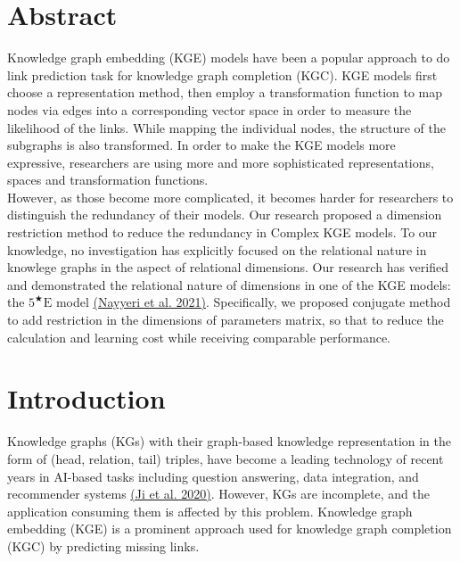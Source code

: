 \documentclass[9pt]{ctexart}
\theoremstyle{definition}
\begin{document}

\section{Abstract}
Knowledge graph embedding (KGE) models have been a popular approach to do link prediction task for knowledge graph completion (KGC).
KGE models first choose a representation method, then employ a transformation function to map nodes via edges into a corresponding vector space in order to measure the likelihood of the links.
While mapping the individual nodes, the structure of the subgraphs is also transformed.
In order to make the KGE models more expressive, researchers are using more and more sophisticated representations, spaces and transformation functions.\\
However, as those become more complicated, it becomes harder for researchers to distinguish the redundancy of their models.
Our research proposed a dimension restriction method to reduce the redundancy in Complex KGE models.
To our knowledge, no investigation has explicitly focused on the relational nature in knowlege graphs in the aspect of relational dimensions.
Our research has verified and demonstrated the relational nature of dimensions in one of the KGE models: the $5^{\bigstar}\mathrm{E}$ model
\hyperlink{Nay21}{(Nayyeri et al. 2021)}.
Specifically, we proposed conjugate method to add restriction in the dimensions of parameters matrix, so that to reduce the calculation and learning cost while receiving comparable performance.

\section{Introduction}
Knowledge graphs (KGs) with their graph-based knowledge representation in the form of (head, relation, tail) triples, have become a leading technology of recent years in AI-based tasks including question answering, data integration, and recommender systems 
\hyperlink{JiS20}{(Ji et al. 2020)}. 
However, KGs are incomplete, and the application consuming them is affected by this problem.
Knowledge graph embedding (KGE) is a prominent approach used for knowledge graph completion (KGC) by predicting missing links.
\end{document}
